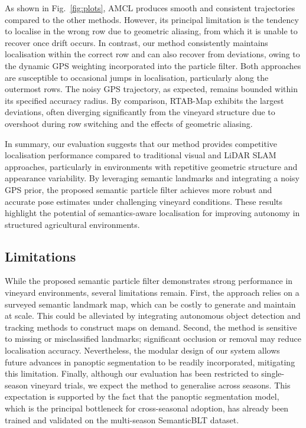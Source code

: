 \documentclass[letterpaper, 10 pt, conference]{ieeeconf}
\begin{document}
As shown in Fig.~\ref{fig:plots}, AMCL produces smooth and consistent trajectories compared to the other methods. However, its principal limitation is the tendency to localise in the wrong row due to geometric aliasing, from which it is unable to recover once drift occurs. In contrast, our method consistently maintains localisation within the correct row and can also recover from deviations, owing to the dynamic GPS weighting incorporated into the particle filter. Both approaches are susceptible to occasional jumps in localisation, particularly along the outermost rows. The noisy GPS trajectory, as expected, remains bounded within its specified accuracy radius. By comparison, RTAB-Map exhibits the largest deviations, often diverging significantly from the vineyard structure due to overshoot during row switching and the effects of geometric aliasing.

In summary, our evaluation suggests that our method provides competitive localisation performance compared to traditional visual and LiDAR SLAM approaches, particularly in environments with repetitive geometric structure and appearance variability. By leveraging semantic landmarks and integrating a noisy GPS prior, the proposed semantic particle filter achieves more robust and accurate pose estimates under challenging vineyard conditions. These results highlight the potential of semantics-aware localisation for improving autonomy in structured agricultural environments.

\subsection{Limitations}
While the proposed semantic particle filter demonstrates strong performance in vineyard environments, several limitations remain. First, the approach relies on a surveyed semantic landmark map, which can be costly to generate and maintain at scale. This could be alleviated by integrating autonomous object detection and tracking methods to construct maps on demand. Second, the method is sensitive to missing or misclassified landmarks; significant occlusion or removal may reduce localisation accuracy. Nevertheless, the modular design of our system allows future advances in panoptic segmentation to be readily incorporated, mitigating this limitation. Finally, although our evaluation has been restricted to single-season vineyard trials, we expect the method to generalise across seasons. This expectation is supported by the fact that the panoptic segmentation model, which is the principal bottleneck for cross-seasonal adoption, has already been trained and validated on the multi-season SemanticBLT dataset.
\end{document}
